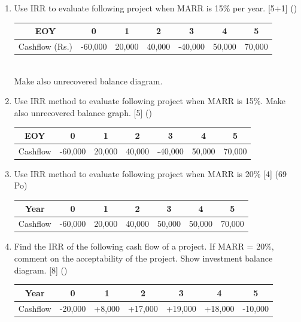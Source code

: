 \documentclass[12pt]{article}
\begin{document}
\begin{enumerate}
				\item Use IRR to evaluate following project when MARR is 15\% per year. \hfill [5+1] ()\\
				\begin{tabular}{|c|c|c|c|c|c|c|}
					\hline
					EOY & 0 & 1 & 2 & 3 & 4 & 5\\ \hline
					Cashflow (Rs.) & -60,000 & 20,000 & 40,000 & -40,000 & 50,000 & 70,000\\ \hline
				\end{tabular}\\
				Make also unrecovered balance diagram.
				
				\item Use IRR method to evaluate following project when MARR is 15\%. Make also unrecovered balance graph. \hfill [5] ()\\
				\begin{tabular}{|c|c|c|c|c|c|c|}
					\hline
					EOY & 0 & 1 & 2 & 3 & 4 & 5\\ \hline
					Cashflow & -60,000 & 20,000 & 40,000 & -40,000 & 50,000 & 70,000\\ \hline
				\end{tabular}
				
				\item Use IRR method to evaluate following project when MARR is 20\% \hfill [4] (69 Po)\\
				\begin{tabular}{|c|c|c|c|c|c|c|}
					\hline
					Year & 0 & 1 & 2 & 3 & 4 & 5\\ \hline
					Cashflow & -60,000 & 20,000 & 40,000 & 50,000 & 50,000 & 70,000\\ \hline
				\end{tabular}
				
				\item Find the IRR of the following cash flow of a project. If MARR = 20\%, comment on the acceptability of the project. Show investment balance diagram. \hspace{4cm} [8] ()
				\begin{tabular}{|c|c|c|c|c|c|c|}
					\hline
					Year & 0 & 1 & 2 & 3 & 4 & 5\\ \hline
					Cashflow & -20,000 & +8,000 & +17,000 & +19,000 & +18,000 & -10,000\\ \hline
				\end{tabular}
			\end{enumerate}
\end{document}
